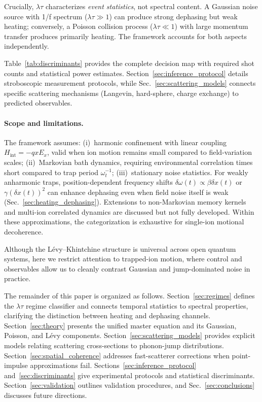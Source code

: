 Crucially, $\lambda\tau$ characterizes \emph{event statistics}, not spectral content. A Gaussian noise source with 1/f spectrum ($\lambda\tau \gg 1$) can produce strong dephasing but weak heating; conversely, a Poisson collision process ($\lambda\tau \ll 1$) with large momentum transfer produces primarily heating. The framework accounts for both aspects independently.

Table~\ref{tab:discriminants} provides the complete decision map with required shot counts and statistical power estimates. Section~\ref{sec:inference_protocol} details stroboscopic measurement protocols, while Sec.~\ref{sec:scattering_models} connects specific scattering mechanisms (Langevin, hard-sphere, charge exchange) to predicted observables.

\paragraph{Scope and limitations.}
The framework assumes: (i)~harmonic confinement with linear coupling $H_{\text{int}} = -qxE_x$, valid when ion motion remains small compared to field-variation scales; (ii)~Markovian bath dynamics, requiring environmental correlation times short compared to trap period $\omega_t^{-1}$; (iii)~stationary noise statistics. For weakly anharmonic traps, position-dependent frequency shifts $\delta\omega(t) \propto \beta \delta x(t)$ or $\gamma (\delta x(t))^2$ can enhance dephasing even when field noise itself is weak (Sec.~\ref{sec:heating_dephasing}). Extensions to non-Markovian memory kernels and multi-ion correlated dynamics are discussed but not fully developed. Within these approximations, the categorization is exhaustive for single-ion motional decoherence.

Although the L\'evy--Khintchine structure is universal across open quantum systems, here we restrict attention to trapped-ion motion, where control and observables allow us to cleanly contrast Gaussian and jump-dominated noise in practice.

The remainder of this paper is organized as follows. Section~\ref{sec:regimes} defines the $\lambda\tau$ regime classifier and connects temporal statistics to spectral properties, clarifying the distinction between heating and dephasing channels. Section~\ref{sec:theory} presents the unified master equation and its Gaussian, Poisson, and L\'evy components. Section~\ref{sec:scattering_models} provides explicit models relating scattering cross-sections to phonon-jump distributions. Section~\ref{sec:spatial_coherence} addresses fast-scatterer corrections when point-impulse approximations fail. Sections~\ref{sec:inference_protocol} and~\ref{sec:discriminants} give experimental protocols and statistical discriminants. Section~\ref{sec:validation} outlines validation procedures, and Sec.~\ref{sec:conclusions} discusses future directions.
